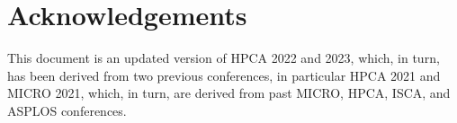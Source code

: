 \section*{Acknowledgements}
This document is an updated version of HPCA 2022 and 2023, which, in
turn, has been derived from two previous conferences, in particular
HPCA 2021 and MICRO 2021, which, in turn, are derived from past MICRO,
HPCA, ISCA, and ASPLOS conferences.

